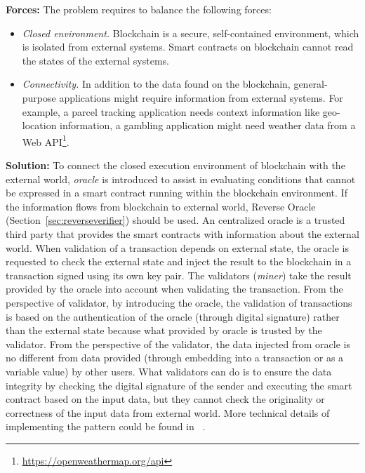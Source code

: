 \vspace{0.5em}\noindent \textbf{Forces:} 
The problem requires to balance the following forces:
\begin{itemize}
  \item \textit{Closed environment.} Blockchain is a secure, self-contained environment, which is isolated from external systems. Smart contracts on blockchain cannot read the states of the external systems.
  \item \textit{Connectivity.} In addition to the data found on the blockchain, general-purpose applications might require information from external systems. For example, a parcel tracking application needs context information like geo-location information, a gambling application might need weather data from a Web API\footnote{\url{https://openweathermap.org/api}}.
\end{itemize}

\vspace{0.5em}\noindent \textbf{Solution:} 
To connect the closed execution environment of blockchain with the external world, \textit{oracle} is introduced to assist in evaluating conditions that cannot be expressed in a smart contract running within the blockchain environment. If the information flows from blockchain to external world, Reverse Oracle (Section~\ref{sec:reverseverifier}) should be used. An centralized oracle is a trusted third party that provides the smart contracts with information about the external world. When validation of a transaction depends on external state, the oracle is requested to check the external state and inject the result to the blockchain in a transaction signed using its own key pair. The validators (\emph{miner}) take the result provided by the oracle into account when validating the transaction. From the perspective of validator, by introducing the oracle, the validation of transactions is based on the authentication of the oracle (through digital signature) rather than the external state because what provided by oracle is trusted by the validator. From the perspective of the validator, the data injected from oracle is no different from data provided (through embedding into a transaction or as a variable value) by other users. What validators can do is to ensure the data integrity by checking the digital signature of the sender and executing the smart contract based on the input data, but they cannot check the originality or correctness of the input data from external world. More technical details of implementing the pattern could be found in ~\cite{2020-Muehlberger-BPM-BC}. 

